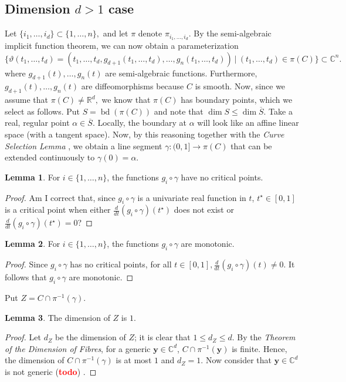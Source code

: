 \documentclass[10pt]{article}
\theoremstyle{definition}
\newtheorem{lemma}{Lemma}
\newcommand{\C}{\mathbb{C}}
\newcommand{\R}{\mathbb{R}}
\def\td{(\textcolor{red}{{\bf todo}})}
\def\td{(\textcolor{red}{{\bf todo}}) }
\DeclareMathOperator{\bd}{bd}
\begin{document}
\subsection{Dimension $d>1$ case}
Let $\{i_1,\hdots,i_d\} \subset \{1,\hdots,n\},$ and let $\pi$ denote $\pi_{i_1,\hdots,i_d}.$ By the semi-algebraic implicit function theorem, we can now obtain a parameterization
\[
\big\{\vartheta(t_1,\hdots,t_d) = \left(t_1,\hdots,t_d,g_{d+1}(t_1,\hdots,t_d),\hdots,g_{n}(t_1,\hdots,t_d)\right)~|~ (t_1,\hdots,t_d) \in \pi(C)\big\} \subset \C^n.
\]
where $g_{d+1}(t),\hdots,g_n(t)$ are semi-algebraic functions.  Furthermore, $g_{d+1}(t),\hdots,g_n(t)$ are diffeomorphisms because $C$ is smooth. Now, since we assume that $\pi(C) \not = \R^d,$ we know that $\pi(C)$ has boundary points, which we select as follows. Put $S = \bd\left( \pi(C) \right)$ and note that $\dim S \leq \dim \overline{S}.$ Take a real, regular point $\alpha \in \overline{S}.$ Locally, the boundary at $\alpha$ will look like an affine linear space (with a tangent space). Now, by this reasoning together with the \textit{Curve Selection Lemma} \cite{CurveSelectionLemma},  
we obtain a line segment $\gamma: (0,1] \rightarrow \pi(C)$ that can be extended continuously to $\gamma(0)=\alpha.$ 
%
\begin{lemma}
For $i \in \{1,\hdots,n\}$, the functions $g_i \circ \gamma$ have no critical points. 
\end{lemma}
%
%
\begin{proof}
\color{red} Am I correct that, since $g_i \circ \gamma$ is a univariate real function in $t$,  $t^\star \in [0,1]$ is a critical point when either  $\frac{d}{dt}\left(g_i \circ \gamma\right)(t^\star)$ does not exist or $\frac{d}{dt}\left(g_i \circ \gamma\right)(t^\star)=0$?\color{black}
\end{proof}
%
%
\begin{lemma}
For $i \in \{1,\hdots,n\}$, the functions $g_i \circ \gamma$ are monotonic. 
\end{lemma}
%
%
\begin{proof}
Since $g_i \circ \gamma$ has no critical points, for all $t \in [0,1], \frac{d}{dt}\left(g_i \circ \gamma\right)(t)\not =0.$ It follows that $g_i \circ \gamma$ are monotonic. 
\end{proof}
%
\noindent 
Put $Z = C \cap \pi^{-1}(\gamma).$ 
%
\begin{lemma}
The dimension of $Z$ is $1$. 
\end{lemma}
%
%
\begin{proof}
Let $d_Z$ be the dimension of $Z$; it is clear that $1 \leq d_Z \leq d$. By the 
\textit{Theorem of the Dimension of Fibres}\cite{Shafarevich}, for a generic $\bm y \in \C^d$, $C \cap \pi^{-1}(\bm y)$ is finite. Hence, the dimension of $C \cap \pi^{-1}(\gamma)$ is at most $1$ and $d_Z=1$. Now consider that $\bm y \in \C^d$ is not generic \td.
\end{proof}
\end{document}
